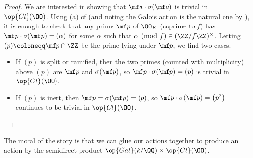 \documentclass[../notes.tex]{subfiles}
\begin{document}
\begin{proof}
	We are interested in showing that $\mf a\cdot\sigma(\mf a)$ is trivial in $\op{Cl}(\OO)$. Using (a) of  (and noting the Galois action is the natural one by ), it is enough to check that any prime $\mf p$ of $\OO_K$ (coprime to $f$) has $\mf p\cdot\sigma(\mf p)=(\alpha)$ for some $\alpha$ such that $\alpha\pmod f\in(\ZZ/f\ZZ)^\times$. Letting $(p)\coloneqq\mf p\cap\ZZ$ be the prime lying under $\mf p$, we find two cases.
	\begin{itemize}
		\item If $(p)$ is split or ramified, then the two primes (counted with multiplicity) above $(p)$ are $\mf p$ and $\sigma(\mf p)$, so $\mf p\cdot\sigma(\mf p)=(p)$ is trivial in $\op{Cl}(\OO)$.
		\item If $(p)$ is inert, then $\mf p=\sigma(\mf p)=(p)$, so $\mf p\cdot\sigma(\mf p)=\left(p^2\right)$ continues to be trivial in $\op{Cl}(\OO)$.
		\qedhere
	\end{itemize}
\end{proof}
The moral of the story is that we can glue our actions together to produce an action by the semidirect product $\op{Gal}(k/\QQ)\rtimes\op{Cl}(\OO)$.
\end{document}
